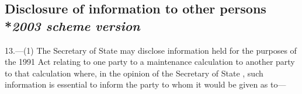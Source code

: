 \documentclass[12pt,a4paper]{article}
\begin{document}

\subsection[13. Disclosure of information to other persons --- \emph{2003 scheme version}]{Disclosure of information to other persons\\*\emph{2003 scheme version}}

13.---(1)  The 
Secretary of State  %
may disclose information held for the purposes of the 1991 Act relating to one party to a maintenance calculation to another party to that calculation where, in the opinion of the 
Secretary of State%
, such information is essential to inform the party to whom it would be given as to—
\end{document}

